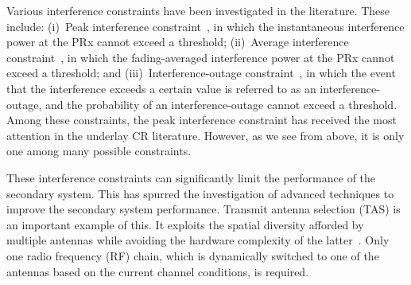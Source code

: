 \documentclass[12pt,draftcls,peerreview,onecolumn]{IEEEtran}
\begin{document}
Various interference constraints have been investigated in the literature. These include: (i)~Peak interference constraint~\cite{Fakhan_2014_TSP,Hanif_2015_globecom,Wang_2010_TWC,RZhang_2009_TWC,Suraweera_2010_TVT,li_2011_pimrc}, in which  the instantaneous interference power at the PRx cannot exceed  a threshold; (ii)~Average interference constraint~\cite{ Sarvendranath_2013_TCOM,Sarvendranath_2014_TCOM,Wang_2011_TCom}, in which  the fading-averaged interference power at the PRx  cannot exceed  a threshold;  and (iii)~Interference-outage constraint~\cite{Kashyap_2014_TCOM,Sboui_2013_TWC}, in which the event that the interference exceeds a certain value is referred to as an interference-outage, and the probability of an interference-outage cannot exceed a threshold. Among these constraints, the peak interference constraint has received the most attention in the underlay CR literature. However, as we see from above, it is only one among many possible constraints. 

These interference constraints can significantly limit the performance of the secondary system. This has spurred the investigation of advanced techniques to improve the secondary system performance. Transmit antenna selection (TAS) is an important example of this. It exploits the spatial diversity afforded by multiple antennas while avoiding the hardware complexity of the latter~\cite{mehta_2012_ComMag}. Only one radio frequency (RF) chain, which is dynamically switched to one of the antennas based on the current channel conditions, is required. 
\end{document}

